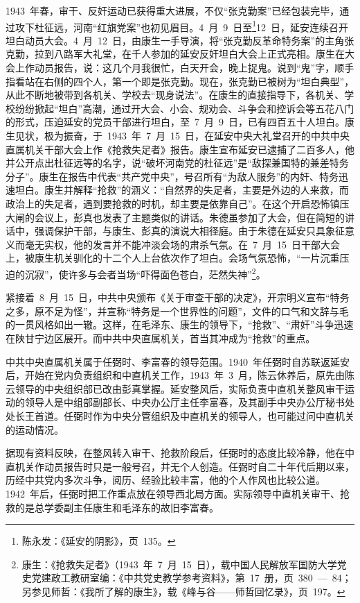 1943~年春，审干、反奸运动已获得重大进展，不仅“张克勤案”已经包装完毕，通过攻下杜征远，河南“红旗党案”也初见眉目。4~月~9~日至\footnote{陈永发：《延安的阴影》，页~135。}12~日，延安连续召开坦白动员大会。4~月~12~日，由康生一手导演，将“张克勤反革命特务案”的主角张克勤，拉到八路军大礼堂，在千人参加的延安反奸坦白大会上正式亮相。康生在大会上作动员报告，说：这几个月我很忙，白天开会，晚上捉鬼。说到“鬼”字，顺手指看站在右侧的四个人，第一个即是张克勤。现在，张克勤已被树为“坦白典型”，从此不断地被带到各机关、学校去“现身说法”。在康生的直接指导下，各机关、学校纷纷掀起“坦白”高潮，通过开大会、小会、规劝会、斗争会和控诉会等五花八门的形式，压迫延安的党员干部进行坦白，至~7~月~9~日，已有四百五十人坦白。康生见状，极为振奋，于~1943~年~7~月~15~日，在延安中央大礼堂召开的中共中央直属机关干部大会上作《抢救失足者》报告。康生宣布延安已逮捕了二百多人，他并公开点出杜征远等的名字，说“破坏河南党的杜征远”是“敌探兼国特的兼差特务分子”。康生在报告中代表“共产党中央”，号召所有“为敌人服务”的内奸、特务迅速坦白。康生并解释“抢救”的涵义：“自然界的失足者，主要是外边的人来救，而政治上的失足者，遇到要抢救的时机，却主要是依靠自己”。在这个开启恐怖镇压大闸的会议上，彭真也发表了主题类似的讲话。朱德虽参加了大会，但在简短的讲话中，强调保护干部，与康生、彭真的演说大相径庭。由于朱德在延安只具象征意义而毫无实权，他的发言并不能冲淡会场的肃杀气氛。在~7~月~15~日干部大会上，被康生机关驯化的十二个人上台依次作了坦白。会场气氛恐怖，“一片沉重压迫的沉寂”，使许多与会者当场“吓得面色苍白，茫然失神”\footnote{康生：《抢救失足者》（1943~年~7~月~15~日），载中国人民解放军国防大学党史党建政工教研室编：《中共党史教学参考资料》，第~17~册，页~380~—~84；另参见师哲：《我所了解的康生》，载《峰与谷——师哲回忆录》，页~197。}。

紧接着~8~月~15~日，中共中央颁布《关于审查干部的决定》，开宗明义宣布“特务之多，原不足为怪”，并宣称“特务是一个世界性的问题”，文件的口气和文辞与毛的一贯风格如出一辙。这样，在毛泽东、康生的领导下，“抢救”、“肃奸”斗争迅速在陕甘宁边区展开。而中共中央直属机关，首当其冲成为“抢救”的重点。

中共中央直属机关属于任弼时、李富春的领导范围。1940~年任弼时自苏联返延安后，开始在党内负责组织和中直机关工作，1943~年~3~月，陈云休养后，原先由陈云领导的中央组织部已改由彭真掌握。延安整风后，实际负责中直机关整风审干运动的领导人是中组部副部长、中央办公厅主任李富春，及其副手中央办公厅秘书处处长王首道。任弼时作为中央分管组织及中直机关的领导人，也可能过问中直机关的运动情况。

据现有资料反映，在整风转入审干、抢救阶段后，任弼时的态度比较冷静，他在中直机关作动员报告时只是一般号召，并无个人创造。任弼时自二十年代后期以来，历经中共党内多次斗争，阅历、经验比较丰富，他的个人作风也比较公道。1942~年后，任弼时把工作重点放在领导西北局方面。实际领导中直机关审干、抢救的是总学委副主任康生和毛泽东的故旧李富春。


